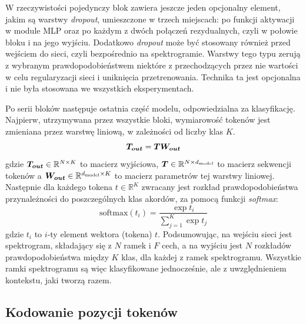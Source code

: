 W rzeczywistości pojedynczy blok zawiera jeszcze jeden opcjonalny element, jakim są warstwy \emph{dropout}, umieszczone w trzech miejscach: po funkcji aktywacji w module MLP oraz po każdym z dwóch połączeń rezydualnych, czyli w połowie bloku i na jego wyjściu. Dodatkowo \emph{dropout} może być stosowany również przed wejściem do sieci, czyli bezpośrednio na spektrogramie. Warstwy tego typu zerują z wybranym prawdopodobieństwem niektóre z przechodzących przez nie wartości w celu regularyzacji sieci i uniknięcia przetrenowania. Technika ta jest opcjonalna i nie była stosowana we wszystkich eksperymentach.

Po serii bloków następuje ostatnia część modelu, odpowiedzialna za klasyfikację. Najpierw, utrzymywana przez wszystkie bloki, wymiarowość tokenów jest zmieniana przez warstwę liniową, w zależności od liczby klas $K$.
\begin{equation}
    \boldsymbol{T_{out}} = \boldsymbol{T} \boldsymbol{W_{out}}
\end{equation}
gdzie $\boldsymbol{T_{out}} \in \mathbb{R}^{N \times K}$ to macierz wyjściowa, $\boldsymbol{T} \in \mathbb{R}^{N \times d_{\mathrm{model}}}$ to macierz sekwencji tokenów a $\boldsymbol{W_{out}} \in \mathbb{R}^{d_{\mathrm{model}} \times K}$ to macierz parametrów tej warstwy liniowej. Następnie dla każdego tokena $t \in \mathbb{R}^K$ zwracany jest rozkład prawdopodobieństwa przynależności do poszczególnych klas akordów, za pomocą funkcji \emph{softmax}:
\begin{equation}
    \textrm{softmax}(t_i) = \frac{\exp{t_i}}{\sum_{j=1}^{K}\exp{t_j}}
\end{equation}
gdzie $t_i$ to $i$-ty element wektora (tokena) $t$. Podsumowując, na wejściu sieci jest spektrogram, składający się z $N$ ramek i $F$ cech, a na wyjściu jest $N$ rozkładów prawdopodobieństwa między $K$ klas, dla każdej z ramek spektrogramu. Wszystkie ramki spektrogramu są więc klasyfikowane jednocześnie, ale z uwzględnieniem kontekstu, jaki tworzą razem.

\subsection{Kodowanie pozycji tokenów}

